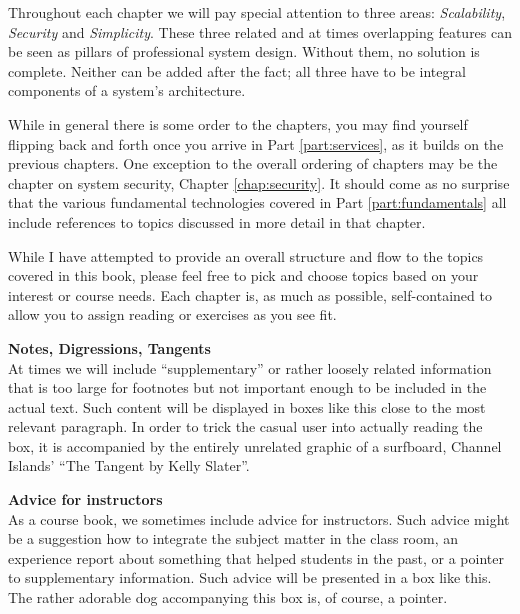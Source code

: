 Throughout each chapter we will pay special attention
to three areas: {\em Scalability}, {\em Security} and
{\em Simplicity}.  These three related and at times
overlapping features can be seen as pillars of
professional system design.  Without them, no solution
is complete.  Neither can be added after the fact; all
three have to be integral components of a system's
architecture.

While in general there is some order to the chapters,
you may find yourself flipping back and forth once you
arrive in Part \ref{part:services}, as it builds on
the previous chapters.  One exception to the overall
ordering of chapters may be the chapter on system
security, Chapter \ref{chap:security}.  It should come
as no surprise that the various fundamental
technologies covered in Part \ref{part:fundamentals}
all include references to topics discussed in more
detail in that chapter.

While I have attempted to provide an overall structure
and flow to the topics covered in this book, please
feel free to pick and choose topics based on your
interest or course needs.  Each chapter is, as much as
possible, self-contained to allow you to assign
reading or exercises as you see fit.

\begin{sidenote}
{\bf Notes, Digressions, Tangents} \\
At times we will include ``supplementary'' or rather loosely related
information that is too large for footnotes but not important enough to be
included in the actual text.  Such content will be displayed in boxes like
this close to the most relevant paragraph.  In order to trick the casual
user into actually reading the box, it is accompanied by the entirely
unrelated graphic of a surfboard, Channel Islands' ``The Tangent by Kelly
Slater''.
\end{sidenote}

\begin{advice}
{\bf Advice for instructors} \\
As a course book, we sometimes include advice for instructors.  Such
advice might be a suggestion how to integrate the subject
matter in the class room, an experience report about something that
helped students in the past, or a pointer to supplementary information.
Such advice will be presented in a box like this.  The rather adorable dog
accompanying this box is, of course, a pointer.
\end{advice}

